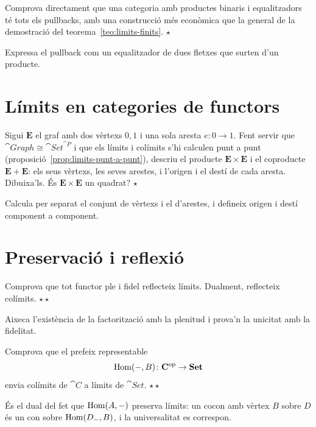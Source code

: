 \begin{exercici}
Comprova directament que una categoria amb productes binaris i equalitzadors té tots els pullbacks, amb una construcció més econòmica que la general de la demostració del teorema~\ref{teo:limits-finits}. \hfill{\normalfont$\star$}
\begin{indicacio}
Expressa el pullback com un equalitzador de dues fletxes que surten d'un producte.
\end{indicacio}
\end{exercici}

\section{Límits en categories de functors}

\begin{exercici}
Sigui $\mathbf E$ el graf amb dos vèrtexs $0,1$ i una sola aresta $e\colon 0\to 1$. Fent servir que $\cat{Graph}\cong\cat{Set}^{\cat{P}}$ i que els límits i colímits s'hi calculen punt a punt (proposició~\ref{prop:limits-punt-a-punt}), descriu el producte $\mathbf E\times\mathbf E$ i el coproducte $\mathbf E+\mathbf E$: els seus vèrtexs, les seves arestes, i l'origen i el destí de cada aresta. Dibuixa'ls. És $\mathbf E\times\mathbf E$ un quadrat? \hfill{\normalfont$\star$}
\begin{indicacio}
Calcula per separat el conjunt de vèrtexs i el d'arestes, i defineix origen i destí component a component.
\end{indicacio}
\end{exercici}

\section{Preservació i reflexió}

\begin{exercici}
Comprova que tot functor ple i fidel reflecteix límits. Dualment, reflecteix colímits. \hfill{\normalfont$\star\star$}
\begin{indicacio}
Aixeca l'existència de la factorització amb la plenitud i prova'n la unicitat amb la fidelitat.
\end{indicacio}
\end{exercici}

\begin{exercici}
Comprova que el prefeix representable
\[
\operatorname{Hom}(-,B)\colon\mathbf{C}^{\mathrm{op}}\to\mathbf{Set}
\]
envia colímits de $\cat{C}$ a límits de $\cat{Set}$. \hfill{\normalfont$\star\star$}
\begin{indicacio}
És el dual del fet que $\operatorname{Hom}(A,-)$ preserva límits: un cocon amb vèrtex $B$ sobre $D$ és un con sobre $\operatorname{Hom}(D_-,B)$, i la universalitat es correspon.
\end{indicacio}
\end{exercici}

